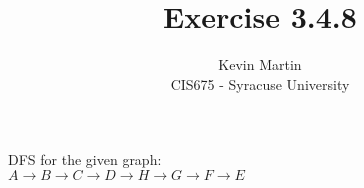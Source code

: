 \documentclass{article}
\author{Kevin Martin\\ CIS675 - Syracuse University}
\title{Exercise 3.4.8}
\begin{document}
\maketitle
DFS for the given graph:\\
$A \rightarrow B \rightarrow C \rightarrow D \rightarrow H \rightarrow 
G \rightarrow F \rightarrow E$
\end{document}
